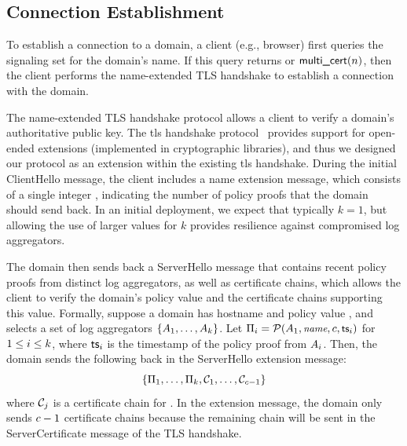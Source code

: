 \subsection{Connection Establishment}
\label{sec:design:handshake}

To establish a connection to a domain, a client (e.g., browser) first queries the 
signaling set for the domain's name.
If this query returns
\onecert or $\textsf{multi\_cert}(n)$, then the client performs the \ac{name}-extended
TLS handshake to establish a connection with the domain.

The \ac{name}-extended TLS handshake protocol allows a client to verify a domain's
authoritative public key. The \ac{tls} handshake protocol~\cite{rfc5246}
provides support for open-ended extensions (implemented in cryptographic
libraries), and thus we designed our protocol as an extension within the
existing \ac{tls} handshake. During the initial ClientHello message, the client
includes a \ac{name} extension message, which consists of a single integer
\numlas, indicating the number of policy proofs that the domain should send back.
In an initial deployment, we expect that typically $k=1$,
but allowing the use of larger values for $k$ provides resilience
against compromised log aggregators.

The domain then sends back a ServerHello message that contains \numlas recent
policy proofs from \numlas distinct log aggregators, as well as \numlas
certificate chains, which allows the client to verify the domain's policy value
and the certificate chains supporting this value. Formally, suppose a domain has
hostname \hostname and policy value \policy, and selects a set of log
aggregators $\{A_1, \ldots, A_k\}$. Let $\Pi_i =
\mathcal{P}(A_1, \small{\emph{name}}, c, \textsf{ts}_i)$ for $1 \le i \le
k$, where $\textsf{ts}_i$ is the timestamp of the policy proof from
$A_i$. Then, the domain sends the following back in the ServerHello
extension message:
\begin{equation}
  \{\Pi_1, \ldots, \Pi_k, \mathcal{C}_1,
  \ldots, \mathcal{C}_{c - 1}\}
\end{equation}
where $\mathcal{C}_j$ is a certificate chain for \hostname. In the extension
message, the domain only sends $c - 1$ certificate chains because the
remaining chain will be sent in the ServerCertificate message of the TLS
handshake.

